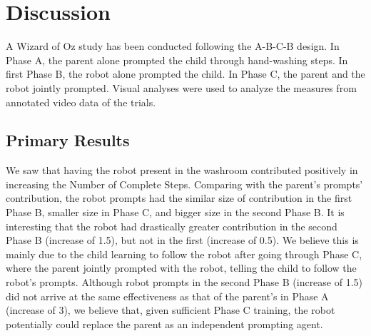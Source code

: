 \documentclass{ut-thesis}
\begin{document}
\section{Discussion}
A Wizard of Oz study has been conducted following the A-B-C-B design.  In Phase A, the parent alone prompted the child through hand-washing steps.  In first Phase B, the robot alone prompted the child.  In Phase C, the parent and the robot jointly prompted.  Visual analyses were used to analyze the measures from annotated video data of the trials.



\subsection{Primary Results}
We saw that having the robot present in the washroom contributed positively in increasing the Number of Complete Steps.  Comparing with the parent's prompts' contribution, the robot prompts had the similar size of contribution in the first Phase B, smaller size in Phase C, and bigger size in the second Phase B.  It is interesting that the robot had drastically greater contribution in the second Phase B (increase of 1.5), but not in the first (increase of 0.5).  We believe this is mainly due to the child learning to follow the robot after going through Phase C, where the parent jointly prompted with the robot, telling the child to follow the robot's prompts.  Although robot prompts in the second Phase B (increase of 1.5) did not arrive at the same effectiveness as that of the parent's in Phase A (increase of 3), we believe that, given sufficient Phase C training, the robot potentially could replace the parent as an independent prompting agent.
\end{document}
